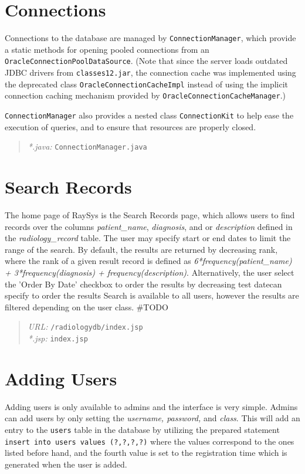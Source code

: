 \documentclass[11pt]{report}
\begin{document}
\section*{Connections}
Connections to the database are managed by \texttt{ConnectionManager}, which provide a static methods for opening pooled connections from an \texttt{OracleConnectionPoolDataSource}. (Note that since the server loads outdated JDBC drivers from \texttt{classes12.jar}, the connection cache was implemented using the deprecated class \texttt{OracleConnectionCacheImpl} instead of using the implicit connection caching mechanism provided by \texttt{OracleConnectionCacheManager}.)

\texttt{ConnectionManager} also provides a nested class \texttt{ConnectionKit} to help ease the execution of queries, and to ensure that resources are properly closed.

\begin{quote}
\emph{*.java: } \texttt{ConnectionManager.java}\\
\end{quote}
\section*{Search Records}
The home page of RaySys is the Search Records page, which allows users to find records over the columns \emph{patient_name}, \emph{diagnosis}, and or \emph{description} defined in the \emph{radiology_record} table. The user may specify start or end dates to limit the range of the search. By default, the results are returned by decreasing rank, where the rank of a given result record is defined as \emph{6*frequency(patient_name) + 3*frequency(diagnosis) + frequency(description)}. Alternatively, the user select the 'Order By Date' checkbox to order the results by decreasing test datecan specify to order the results Search is available to all users, however the results are filtered depending on the user class. \#TODO

\begin{quote}
\emph{URL:} \texttt{/radiologydb/index.jsp} \\
\emph{*.jsp: } \texttt{index.jsp} \\
\end{quote}

\section*{Adding Users}
Adding users is only available to admins and the interface is very simple. Admins can add users by only setting the \emph{username, password,} and \emph{class}. This will add an entry to the \texttt{users} table in the database by utilizing the prepared statement \texttt{insert into users values (?,?,?,?)} where the values correspond to the ones listed before hand, and the fourth value is set to the registration time which is generated when the user is added.
\end{document}
